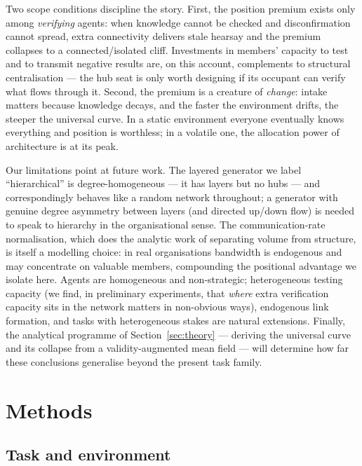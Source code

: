 \documentclass{article}
\begin{document}
Two scope conditions discipline the story. First, the position premium exists only among \emph{verifying} agents: when knowledge cannot be checked and disconfirmation cannot spread, extra connectivity delivers stale hearsay and the premium collapses to a connected/isolated cliff. Investments in members' capacity to test and to transmit negative results are, on this account, complements to structural centralisation --- the hub seat is only worth designing if its occupant can verify what flows through it. Second, the premium is a creature of \emph{change}: intake matters because knowledge decays, and the faster the environment drifts, the steeper the universal curve. In a static environment everyone eventually knows everything and position is worthless; in a volatile one, the allocation power of architecture is at its peak. \parencite{fang2010balancing, shore2015facts}

Our limitations point at future work. The layered generator we label ``hierarchical'' is degree-homogeneous --- it has layers but no hubs --- and correspondingly behaves like a random network throughout; a generator with genuine degree asymmetry between layers (and directed up/down flow) is needed to speak to hierarchy in the organisational sense. The communication-rate normalisation, which does the analytic work of separating volume from structure, is itself a modelling choice: in real organisations bandwidth is endogenous and may concentrate on valuable members, compounding the positional advantage we isolate here. Agents are homogeneous and non-strategic; heterogeneous testing capacity (we find, in preliminary experiments, that \emph{where} extra verification capacity sits in the network matters in non-obvious ways), endogenous link formation, and tasks with heterogeneous stakes are natural extensions. Finally, the analytical programme of Section~\ref{sec:theory} --- deriving the universal curve and its collapse from a validity-augmented mean field --- will determine how far these conclusions generalise beyond the present task family.


\section{Methods}\label{sec:methods}

\subsection{Task and environment}
\end{document}
